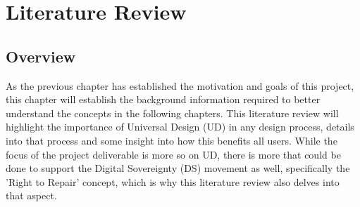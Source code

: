 
\chapter{Literature Review} %

\label{Chapter2} %


\section{Overview} %
As the previous chapter has established the motivation and goals of this project, this chapter will establish the background information required to better understand the concepts in the following chapters.
This literature review will highlight the importance of Universal Design (UD) in any design process, details into that process and some insight into how this benefits all users.
While the focus of the project deliverable is more so on UD, there is more that could be done to support the Digital Sovereignty (DS) movement as well, specifically the 'Right to Repair' concept, which is why this literature review also delves into that aspect.


